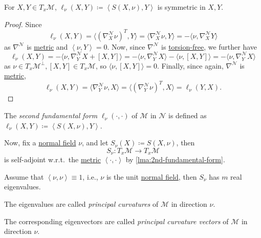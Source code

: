 \begin{lemma}\label{lma:2nd-fundamental-form}
	For \(X, Y\in T_x \mathcal{M} \), \(\ell _\nu (X, Y) \coloneqq \left\langle S(X, \nu) , Y\right\rangle \) is symmetric in \(X, Y\).
\end{lemma}
\begin{proof}
	Since
	\[
		\ell _\nu (X, Y)
		= \langle (\nabla ^\mathcal{N} _X \nu )^T, Y \rangle
		= \langle \nabla _X^{\mathcal{N} } \nu , Y  \rangle
		= - \langle \nu , \nabla ^\mathcal{N} _X Y \rangle
	\]
	as \(\nabla ^\mathcal{N} \) is \hyperref[def:Riemannian]{metric} and \(\left\langle \nu , Y \right\rangle=0 \). Now, since \(\nabla ^\mathcal{N} \) is \hyperref[def:torsion-free]{torsion-free}, we further have
	\[
		\ell _\nu (X, Y)
		= - \langle \nu , \nabla ^\mathcal{N} _Y X + [X, Y] \rangle
		= - \langle \nu , \nabla ^\mathcal{N} _Y X \rangle - \langle \nu , [X, Y] \rangle
		= - \langle \nu , \nabla ^\mathcal{N} _Y X \rangle
	\]
	as \(\nu \in T_x \mathcal{M} ^{\perp}, [X, Y]\in T_x \mathcal{M}\), so \(\langle \nu , [X, Y] \rangle=0\). Finally, since again, \(\nabla ^\mathcal{N} \) is \hyperref[def:Riemannian]{metric},
	\[
		\ell _\nu (X, Y)
		= \langle \nabla _Y^{\mathcal{N} } \nu , X  \rangle
		= \langle (\nabla _Y^{\mathcal{N} } \nu)^T , X  \rangle
		= \ell _\nu (Y, X).
	\]
\end{proof}

\begin{definition}\label{def:2nd-fundamental-form}
	The \emph{second fundamental form} \(\ell _\nu (\cdot, \cdot)\) of \(\mathcal{M} \) in \(\mathcal{N} \) is defined as \(\ell _\nu (X, Y) \coloneqq \left\langle S(X, \nu ), Y \right\rangle \).
\end{definition}

Now, fix a \hyperref[not:normal-bundle]{normal field} \(\nu \), and let \(S_\nu (X) \coloneqq S(X, \nu )\), then
\[
	S_\nu \colon T_x \mathcal{M} \to T_x \mathcal{M}
\]
is self-adjoint w.r.t.\ the \hyperref[def:Riemannian-metric]{metric} \(\left\langle \cdot, \cdot \right\rangle \) by \autoref{lma:2nd-fundamental-form}.

\begin{definition*}
	Assume that \(\left\langle \nu , \nu  \right\rangle \equiv 1\), i.e., \(\nu \) is the unit \hyperref[not:normal-bundle]{normal field}, then \(S_\nu \) has \(m\) real eigenvalues.

	\begin{definition}\label{def:principal-curvature}
		The eigenvalues are called \emph{principal curvatures} of \(\mathcal{M} \) in direction \(\nu \).
	\end{definition}

	\begin{definition}\label{def:principal-curvature-vector}
		The corresponding eigenvectors are called \emph{principal curvature vectors} of \(\mathcal{M} \) in direction \(\nu \).
	\end{definition}
\end{definition*}



